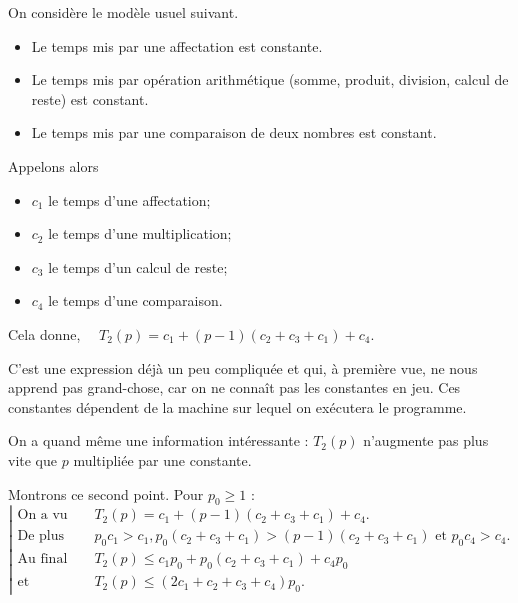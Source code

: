 On considère le modèle usuel suivant.

\begin{itemize}
\item Le temps mis par une affectation est constante.
\item Le temps mis par opération arithmétique (somme, produit,
  division, calcul de reste) est constant.
\item Le temps mis par une comparaison de deux nombres est constant.
\end{itemize}

Appelons alors
\begin{itemize}
\item $c_{1}$ le temps d'une affectation;
\item $c_{2}$ le temps d'une multiplication;
\item $c_{3}$ le temps d'un calcul de reste;
\item $c_{4}$ le temps d'une comparaison.
\end{itemize}

Cela donne,
$ \quad   T_{2}(p) = c_{1} + (p-1) (c_{2} + c_{3} + c_{1}) + c_{4}$.


C'est une expression déjà un peu compliquée et qui, à première vue,  ne nous apprend pas grand-chose, car on ne  connaît pas les constantes en jeu.
Ces constantes dépendent de la machine sur lequel on  exécutera le programme. 

On a quand même une information intéressante : $T_{2}(p)$ n'augmente pas plus vite que $p$ multipliée par une constante.

%
%  
  
Montrons ce second point. Pour $p_0\geq 1$ : 
$ \left |\begin{array}{ll}
\text{On a vu que } & T_{2}(p) = c_{1} + (p-1) (c_{2} + c_{3} + c_{1}) + c_{4}. \\
\text{De plus} & p_0c_{1}> c_{1}, p_0 (c_{2} + c_{3} + c_{1}) > (p-1) (c_{2} + c_{3} + c_{1}) \text{ et  } p_0c_{4}>c_4. \\
\text{Au final }&    T_{2}(p) \leq c_{1}p_0 + p_0(c_{2}+c_{3}+c_{1})+c_{4}p_0\\
\text{et }  & T_{2}(p)\leq (2c_{1}+c_{2}+c_{3}+c_{4})p_0.
  \end{array}\right.$
  

